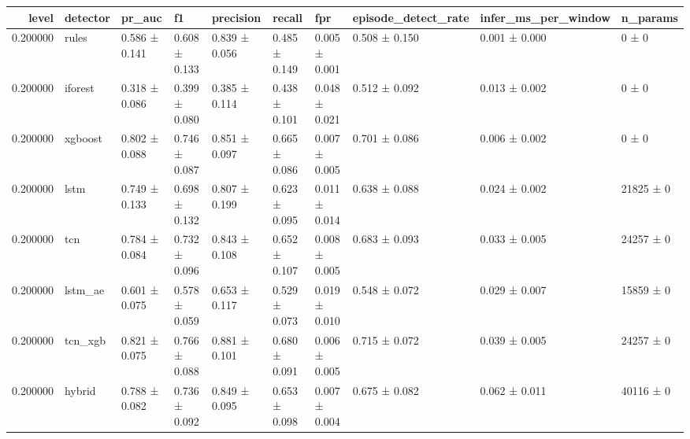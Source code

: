 \begin{tabular}{rlllllllll}
\toprule
level & detector & pr\_auc & f1 & precision & recall & fpr & episode\_detect\_rate & infer\_ms\_per\_window & n\_params \\
\midrule
0.200000 & rules & 0.586 ± 0.141 & 0.608 ± 0.133 & 0.839 ± 0.056 & 0.485 ± 0.149 & 0.005 ± 0.001 & 0.508 ± 0.150 & 0.001 ± 0.000 & 0 ± 0 \\
0.200000 & iforest & 0.318 ± 0.086 & 0.399 ± 0.080 & 0.385 ± 0.114 & 0.438 ± 0.101 & 0.048 ± 0.021 & 0.512 ± 0.092 & 0.013 ± 0.002 & 0 ± 0 \\
0.200000 & xgboost & 0.802 ± 0.088 & 0.746 ± 0.087 & 0.851 ± 0.097 & 0.665 ± 0.086 & 0.007 ± 0.005 & 0.701 ± 0.086 & 0.006 ± 0.002 & 0 ± 0 \\
0.200000 & lstm & 0.749 ± 0.133 & 0.698 ± 0.132 & 0.807 ± 0.199 & 0.623 ± 0.095 & 0.011 ± 0.014 & 0.638 ± 0.088 & 0.024 ± 0.002 & 21825 ± 0 \\
0.200000 & tcn & 0.784 ± 0.084 & 0.732 ± 0.096 & 0.843 ± 0.108 & 0.652 ± 0.107 & 0.008 ± 0.005 & 0.683 ± 0.093 & 0.033 ± 0.005 & 24257 ± 0 \\
0.200000 & lstm\_ae & 0.601 ± 0.075 & 0.578 ± 0.059 & 0.653 ± 0.117 & 0.529 ± 0.073 & 0.019 ± 0.010 & 0.548 ± 0.072 & 0.029 ± 0.007 & 15859 ± 0 \\
0.200000 & tcn\_xgb & 0.821 ± 0.075 & 0.766 ± 0.088 & 0.881 ± 0.101 & 0.680 ± 0.091 & 0.006 ± 0.005 & 0.715 ± 0.072 & 0.039 ± 0.005 & 24257 ± 0 \\
0.200000 & hybrid & 0.788 ± 0.082 & 0.736 ± 0.092 & 0.849 ± 0.095 & 0.653 ± 0.098 & 0.007 ± 0.004 & 0.675 ± 0.082 & 0.062 ± 0.011 & 40116 ± 0 \\
\bottomrule
\end{tabular}
